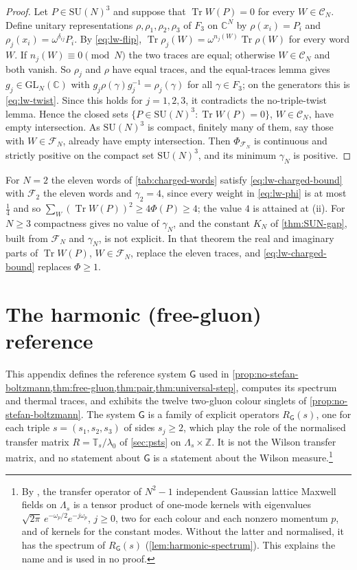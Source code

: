 \documentclass[11pt,a4paper]{amsart}
\theoremstyle{definition}
\theoremstyle{remark}
\numberwithin{equation}{section}
\DeclareMathOperator{\Tr}{Tr}        %
\newcommand{\C}{\mathbb{C}}          %
\newcommand{\Z}{\mathbb{Z}}          %
\newcommand{\SU}{\mathrm{SU}}              %
\newcommand{\TT}{\mathbb{T}}               %
\newcommand{\lzero}{\lambda_0}             %
\newcommand{\Gharm}{\mathsf{G}}            %
\begin{document}
\begin{proof}
Let $P\in\SU(N)^3$ and suppose that $\Tr W(P)=0$ for every $W\in\mathcal{C}_N$. Define unitary representations $\rho,\rho_1,\rho_2,\rho_3$ of $F_3$ on $\C^N$ by $\rho(x_i)=P_i$ and $\rho_j(x_i)=\omega^{\delta_{ij}}P_i$. By \eqref{eq:lw-flip}, $\Tr\rho_j(W)=\omega^{n_j(W)}\Tr\rho(W)$ for every word $W$. If $n_j(W)\equiv0\pmod N$ the two traces are equal; otherwise $W\in\mathcal{C}_N$ and both vanish. So $\rho_j$ and $\rho$ have equal traces, and the equal-traces lemma gives $g_j\in\mathrm{GL}_N(\C)$ with $g_j\rho(\gamma)g_j^{-1}=\rho_j(\gamma)$ for all $\gamma\in F_3$; on the generators this is \eqref{eq:lw-twist}. Since this holds for $j=1,2,3$, it contradicts the no-triple-twist lemma. Hence the closed sets $\{P\in\SU(N)^3:\Tr W(P)=0\}$, $W\in\mathcal{C}_N$, have empty intersection. As $\SU(N)^3$ is compact, finitely many of them, say those with $W\in\mathcal{F}_N$, already have empty intersection. Then $\Phi_{\mathcal{F}_N}$ is continuous and strictly positive on the compact set $\SU(N)^3$, and its minimum $\gamma_N$ is positive.
\end{proof}

For $N=2$ the eleven words of \cref{tab:charged-words} satisfy \eqref{eq:lw-charged-bound} with $\mathcal{F}_2$ the eleven words and $\gamma_2=4$, since every weight in \eqref{eq:lw-phi} is at most $\frac14$ and so $\sum_W(\Tr W(P))^2\ge4\Phi(P)\ge4$; the value $4$ is attained at (ii). For $N\ge3$ compactness gives no value of $\gamma_N$, and the constant $K_N$ of \cref{thm:SUN-gap}, built from $\mathcal{F}_N$ and $\gamma_N$, is not explicit. In that theorem the real and imaginary parts of $\Tr W(P)$, $W\in\mathcal{F}_N$, replace the eleven traces, and \eqref{eq:lw-charged-bound} replaces $\Phi\ge1$.
\section{The harmonic (free-gluon) reference}\label{app:harmonic}

This appendix defines the reference system $\Gharm$ used in \cref{prop:no-stefan-boltzmann,thm:free-gluon,thm:pair,thm:universal-step}, computes its spectrum and thermal traces, and exhibits the twelve two-gluon colour singlets of \cref{prop:no-stefan-boltzmann}. The system $\Gharm$ is a family of explicit operators $R_{\Gharm}(s)$, one for each triple $s=(s_1,s_2,s_3)$ of sides $s_j\ge2$, which play the role of the normalised transfer matrix $R=\TT_s/\lzero$ of \cref{sec:psts} on $\Lambda_s\times\Z$. It is not the Wilson transfer matrix, and no statement about $\Gharm$ is a statement about the Wilson measure.\footnote{By \cite[Proposition~38 and its proof, Lemma~47]{bhattacharjee2026first}, the transfer operator of $N^2-1$ independent Gaussian lattice Maxwell fields on $\Lambda_s$ is a tensor product of one-mode kernels with eigenvalues $\sqrt{2\pi}\,e^{-\omega_p/2}e^{-j\omega_p}$, $j\ge0$, two for each colour and each nonzero momentum $p$, and of kernels for the constant modes. Without the latter and normalised, it has the spectrum of $R_{\Gharm}(s)$ (\cref{lem:harmonic-spectrum}). This explains the name and is used in no proof.}
\end{document}
